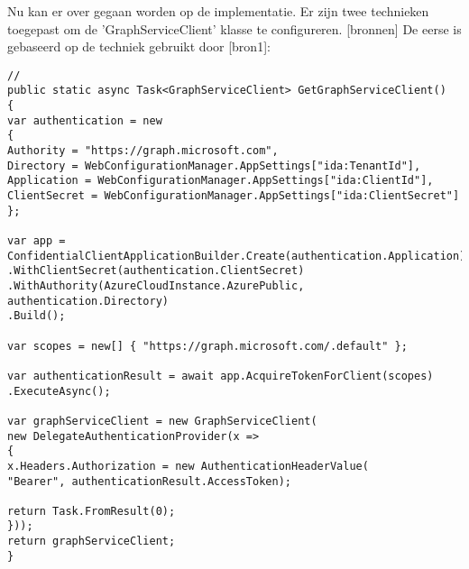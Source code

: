 Nu kan er over gegaan worden op de implementatie. Er zijn twee technieken toegepast om de 'GraphServiceClient' klasse te configureren. [bronnen]
De eerse is gebaseerd op de techniek gebruikt door [bron1]:
\begin{lstlisting}[style=CSharpStyle]
//
public static async Task<GraphServiceClient> GetGraphServiceClient()
{
var authentication = new
{
Authority = "https://graph.microsoft.com",
Directory = WebConfigurationManager.AppSettings["ida:TenantId"],
Application = WebConfigurationManager.AppSettings["ida:ClientId"],
ClientSecret = WebConfigurationManager.AppSettings["ida:ClientSecret"]
};

var app = ConfidentialClientApplicationBuilder.Create(authentication.Application)
.WithClientSecret(authentication.ClientSecret)
.WithAuthority(AzureCloudInstance.AzurePublic, authentication.Directory)
.Build();

var scopes = new[] { "https://graph.microsoft.com/.default" };

var authenticationResult = await app.AcquireTokenForClient(scopes)
.ExecuteAsync();

var graphServiceClient = new GraphServiceClient(
new DelegateAuthenticationProvider(x =>
{
x.Headers.Authorization = new AuthenticationHeaderValue(
"Bearer", authenticationResult.AccessToken);

return Task.FromResult(0);
}));
return graphServiceClient;
}
\end{lstlisting}

